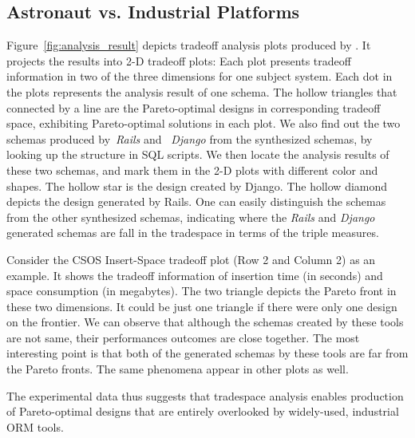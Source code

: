\documentclass[10pt,conference]{IEEEtran}
\begin{document}
\subsection{Astronaut vs. Industrial Platforms} %
Figure~\ref{fig:analysis_result} depicts tradeoff analysis plots produced by \@approach.
It projects the results into 2-D tradeoff plots: Each plot presents tradeoff information in two of the three dimensions for one subject system. 
Each dot in the plots represents the analysis result of one schema. 
The hollow triangles that connected by a line are the Pareto-optimal designs in corresponding tradeoff space, exhibiting Pareto-optimal solutions in each plot. 
We also find out the two schemas produced by~{\em Rails} and ~{\em Django} from the synthesized schemas, by looking up the structure in SQL scripts. We then locate the analysis results of these two schemas, and mark them in the 2-D plots with different color and shapes. 
The hollow star is the design created by Django. The hollow diamond depicts the design generated by Rails.
One can easily distinguish the schemas from the other synthesized schemas, indicating where the {\em Rails} and {\em Django} generated schemas are fall in the tradespace in terms of the triple measures.


Consider the CSOS Insert-Space tradeoff plot (Row 2 and Column 2) as an example. It shows the tradeoff information of insertion time (in seconds) and space consumption (in megabytes). The two triangle depicts the Pareto front in these two dimensions. It could be just one triangle if there were only one design on the frontier. We can observe that although the schemas created by these tools are not same, their performances outcomes are close together. The most interesting point is that both of the generated schemas by these tools are far from the Pareto fronts. The same phenomena appear in other plots as well. 


The experimental data thus suggests that \@approach tradespace analysis enables production of Pareto-optimal designs that are entirely overlooked by widely-used, industrial ORM tools. 
 
 
\end{document}
